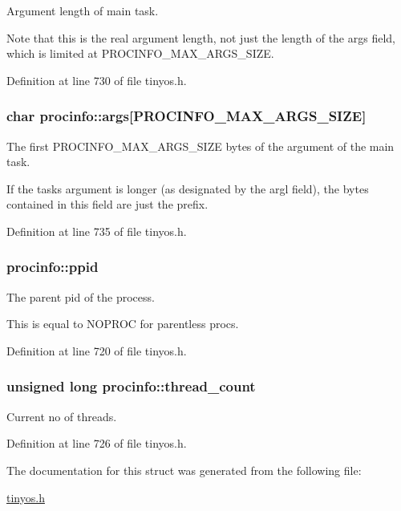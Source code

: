 Argument length of main task. 

Note that this is the real argument length, not just the length of the {\ttfamily args} field, which is limited at {\ttfamily P\+R\+O\+C\+I\+N\+F\+O\+\_\+\+M\+A\+X\+\_\+\+A\+R\+G\+S\+\_\+\+S\+I\+ZE}. 

Definition at line 730 of file tinyos.\+h.

\subsubsection[{\texorpdfstring{args}{args}}]{\setlength{\rightskip}{0pt plus 5cm}char procinfo\+::args\mbox{[}{\bf P\+R\+O\+C\+I\+N\+F\+O\+\_\+\+M\+A\+X\+\_\+\+A\+R\+G\+S\+\_\+\+S\+I\+ZE}\mbox{]}}\hypertarget{structprocinfo_ac812ea3215fafc8ced9f91320b2d3959}{}\label{structprocinfo_ac812ea3215fafc8ced9f91320b2d3959}


The first {\ttfamily P\+R\+O\+C\+I\+N\+F\+O\+\_\+\+M\+A\+X\+\_\+\+A\+R\+G\+S\+\_\+\+S\+I\+ZE} bytes of the argument of the main task. 

If the task\textquotesingle{}s argument is longer (as designated by the {\ttfamily argl} field), the bytes contained in this field are just the prefix. 

Definition at line 735 of file tinyos.\+h.

\subsubsection[{\texorpdfstring{ppid}{ppid}}]{ procinfo\+::ppid}\hypertarget{structprocinfo_a790970c70987013b2712b7dd6d2b75b9}{}\label{structprocinfo_a790970c70987013b2712b7dd6d2b75b9}


The parent pid of the process. 

This is equal to N\+O\+P\+R\+OC for parentless procs. 

Definition at line 720 of file tinyos.\+h.

\subsubsection[{\texorpdfstring{thread\+\_\+count}{thread_count}}]{\setlength{\rightskip}{0pt plus 5cm}unsigned long procinfo\+::thread\+\_\+count}\hypertarget{structprocinfo_ae1ed3afa8904729a1daf1b51780cf2cf}{}\label{structprocinfo_ae1ed3afa8904729a1daf1b51780cf2cf}
Current no of threads. 

Definition at line 726 of file tinyos.\+h.



The documentation for this struct was generated from the following file\+:\begin{DoxyCompactItemize}
\item 
\hyperlink{tinyos_8h}{tinyos.\+h}\end{DoxyCompactItemize}
